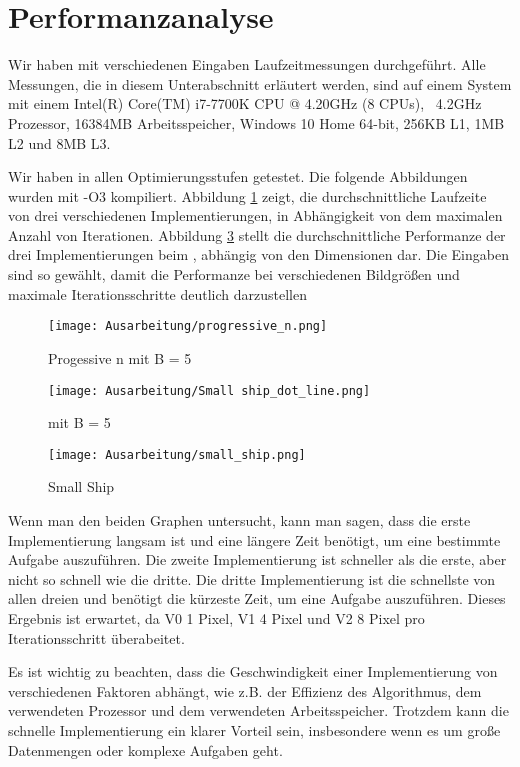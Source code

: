 \documentclass[course=erap]{aspdoc}
\begin{document}
\section{Performanzanalyse}
Wir haben mit verschiedenen Eingaben Laufzeitmessungen durchgeführt. Alle Messungen, die in diesem Unterabschnitt erläutert werden, sind auf einem System mit einem Intel(R) Core(TM) i7-7700K CPU @ 4.20GHz (8 CPUs), ~4.2GHz Prozessor, 16384MB Arbeitsspeicher, Windows 10 Home 64-bit, 256KB L1, 1MB L2 und 8MB L3.

Wir haben in allen Optimierungsstufen getestet. Die folgende Abbildungen wurden mit -O3 kompiliert. Abbildung \ref{fig:progressive_n} zeigt, die durchschnittliche Laufzeite von drei verschiedenen Implementierungen, in Abhängigkeit von dem maximalen Anzahl von Iterationen. Abbildung \ref{fig:small_ship} stellt die durchschnittliche Performanze der drei Implementierungen beim , abhängig von den Dimensionen dar. Die Eingaben sind so gewählt, damit die Performanze bei verschiedenen Bildgrößen und maximale Iterationsschritte deutlich darzustellen
\begin{figure}[htp]
    \centering
    \texttt{[image: Ausarbeitung/progressive\_n.png]}
    \caption{Progessive n mit B = 5}
    \label{fig:progressive_n}
\end{figure}

\begin{figure}[htp]
    \centering
    \texttt{[image: Ausarbeitung/Small ship\_dot\_line.png]}
    \caption{ mit B = 5}
    \label{fig:small_ship_graph}
\end{figure}

\begin{figure}[htp]
    \centering
    \texttt{[image: Ausarbeitung/small\_ship.png]}
    \caption{Small Ship}
    \label{fig:small_ship}
\end{figure}

Wenn man den beiden Graphen untersucht, kann man sagen, dass die erste Implementierung langsam ist und eine längere Zeit benötigt, um eine bestimmte Aufgabe auszuführen. Die zweite Implementierung ist schneller als die erste, aber nicht so schnell wie die dritte. Die dritte Implementierung ist die schnellste von allen dreien und benötigt die kürzeste Zeit, um eine Aufgabe auszuführen. Dieses Ergebnis ist erwartet, da V0 1 Pixel, V1 4 Pixel und V2 8 Pixel pro Iterationsschritt überabeitet.

Es ist wichtig zu beachten, dass die Geschwindigkeit einer Implementierung von verschiedenen Faktoren abhängt, wie z.B. der Effizienz des Algorithmus, dem verwendeten Prozessor und dem verwendeten Arbeitsspeicher. Trotzdem kann die schnelle Implementierung ein klarer Vorteil sein, insbesondere wenn es um große Datenmengen oder komplexe Aufgaben geht.
\end{document}
